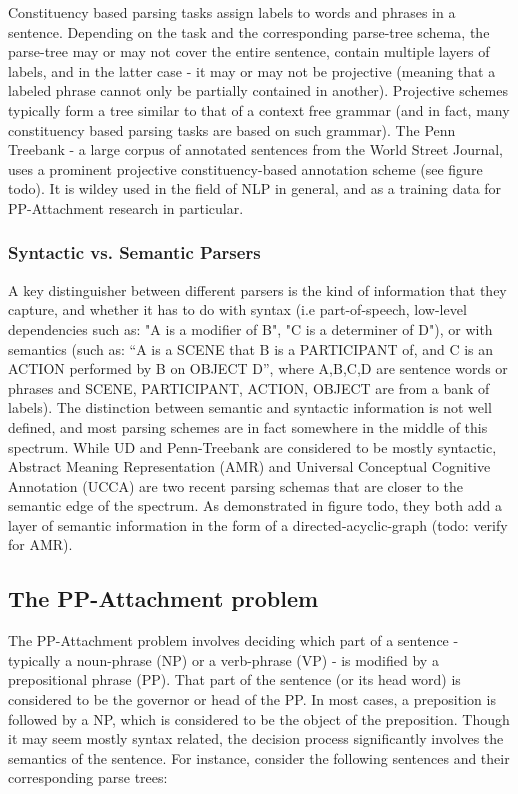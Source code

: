 Constituency based parsing tasks assign labels to words and phrases in a sentence. Depending on the task and the corresponding parse-tree schema, the parse-tree may or may not cover the entire sentence, contain multiple layers of labels, and in the latter case - it may or may not be projective (meaning that a labeled phrase cannot only be partially contained in another). Projective schemes typically form a tree similar to that of a context free grammar (and in fact, many constituency based parsing tasks are based on such grammar). The Penn Treebank - a large corpus of annotated sentences from the World Street Journal, uses a prominent projective constituency-based annotation scheme (see figure todo). It is wildey used in the field of NLP in general, and as a training data for PP-Attachment research in particular.

\subsubsection{Syntactic vs. Semantic Parsers}

A key distinguisher between different parsers is the kind of information that they capture, and whether it has to do with syntax (i.e part-of-speech, low-level dependencies such as: "A is a modifier of B", "C is a determiner of D"), or with semantics (such as: “A is a SCENE that B is a PARTICIPANT of, and C is an ACTION performed by B on OBJECT D”, where A,B,C,D are sentence words or phrases and SCENE, PARTICIPANT, ACTION, OBJECT are from a bank of labels). The distinction between semantic and syntactic information is not well defined, and most parsing schemes are in fact somewhere in the middle of this spectrum. While UD and Penn-Treebank are considered to be mostly syntactic, Abstract Meaning Representation (AMR) and Universal Conceptual Cognitive Annotation (UCCA) are two recent parsing schemas that are closer to the semantic edge of the spectrum. As demonstrated in figure todo, they both add a layer of semantic information in the form of a directed-acyclic-graph (todo: verify for AMR). 

\subsection{The PP-Attachment problem}

The PP-Attachment problem involves deciding which part of a sentence  - typically a noun-phrase (NP) or a verb-phrase (VP) - is modified by a prepositional phrase (PP). That part of the sentence (or its head word) is considered to be the governor or head of the PP. In most cases, a preposition is followed by a NP, which is considered to be the object of the preposition. Though it may seem mostly syntax related, the decision process significantly involves the semantics of the sentence. For instance, consider the following sentences and their corresponding parse trees: 

